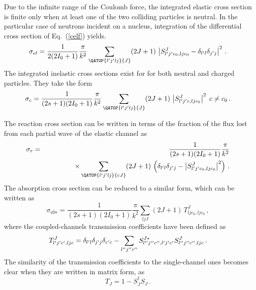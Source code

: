 Due to the infinite range of the Coulomb force, the integrated elastic cross
section is finite only when at least one of the two colliding particles is
neutral. In the particular case of neutrons incident on a nucleus,
integration of the differential cross section of Eq.~(\ref{celf}) yields. 
\begin{equation}
\sigma_{el}=\frac{1}{2(2I_{0}+1)}\frac{\pi}{k^{2}}\sum_{{{\QATOP{%
l^{\prime}j^{\prime}lj}{J}}}}(2J+1)\,\left|S_{l^{\prime}j^{%
\prime}c_{0},ljc_{0}}^{J}-\delta_{l^{\prime}l}\delta_{j^{\prime}j}%
\right|^{2}\,.
\end{equation}
The integrated inelastic cross sections exist for for both neutral and
charged particles. They take the form 
\begin{equation}
\sigma_{c}=\frac{1}{(2s+1)(2I_{0}+1)}\frac{\pi}{k^{2}}\sum_{{{\QATOP{%
l^{\prime}j^{\prime}lj}{J}}}}(2J+1)\,\left|S_{l^{\prime}j^{%
\prime}c,ljc_{0}}^{J}\right|^{2}\; c\neq c_{0}\,.
\end{equation}

The reaction cross section can be written in terms of the fraction of the
flux lost from each partial wave of the elastic channel as 
\begin{eqnarray}
\sigma_{r} & = & \frac{1}{(2s+1)(2I_{0}+1)}\frac{\pi}{k^{2}} \\
& & \qquad\qquad\times\sum_{{{\QATOP{l^{\prime}j^{\prime}lj}{cJ}}}%
}(2J+1)\,\left(\delta_{l^{\prime}l}\delta_{j^{\prime}j}-\left|S_{l^{%
\prime}j^{\prime}c_{0},ljc_{0}}^{J}\right|^{2}\right)\,.  \notag
\end{eqnarray}
The absorption cross section can be reduced to a similar form, which can be
written as 
\begin{equation}
\sigma_{abs}=\frac{1}{(2s+1)(2I_{0}+1)}\frac{\pi}{k^{2}}\sum_{ljJ}(2J+1)\,
T_{ljc_{0},ljc_{0}}^{J}\,,
\end{equation}
where the coupled-channels transmission coefficients have been defined as 
\begin{equation}
T_{l^{\prime}j^{\prime}c^{\prime},ljc}^{J}=\delta_{l^{\prime}l}\delta_{j^{%
\prime}j}\delta_{c^{\prime}c}-\sum_{l^{\prime\prime}j^{\prime\prime}c^{%
\prime\prime}}S_{l^{\prime\prime}j^{\prime\prime}c^{\prime\prime},l^{%
\prime}j^{\prime}c^{\prime}}^{J*}S_{l^{\prime\prime}j^{\prime\prime}c^{%
\prime\prime},ljc}^{J}\,.
\end{equation}
The similarity of the transmission coefficients to the single-channel ones
becomes clear when they are written in matrix form, as 
\begin{equation}
T_{J}=1-S_{J}^{\dagger}S_{J}\,.
\end{equation}

